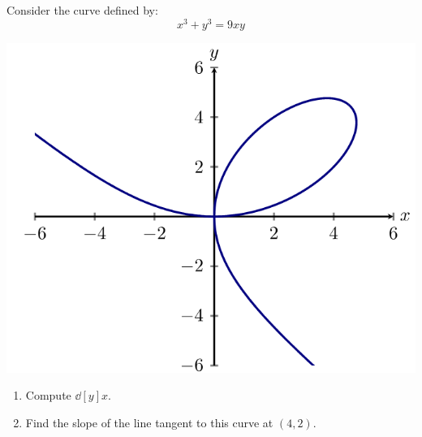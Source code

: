 \documentclass{ximera}
\begin{document}
\begin{example}
Consider the curve defined by:
\[
x^3+y^3 = 9xy
\]
\begin{image}
  \includegraphics{3.png}
\end{image}
\begin{enumerate}
\item Compute $\dd[y]{x}$.
\item Find the slope of the line  tangent to this curve at $(4,2)$.
\end{enumerate}




\end{example}
\end{document}
